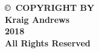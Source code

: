 \newpage
\thispagestyle{empty}

\begin{center}
{\bf \copyright~COPYRIGHT BY \\
Kraig Andrews \\
2018 \\
All Rights Reserved \\
}
\end{center}

